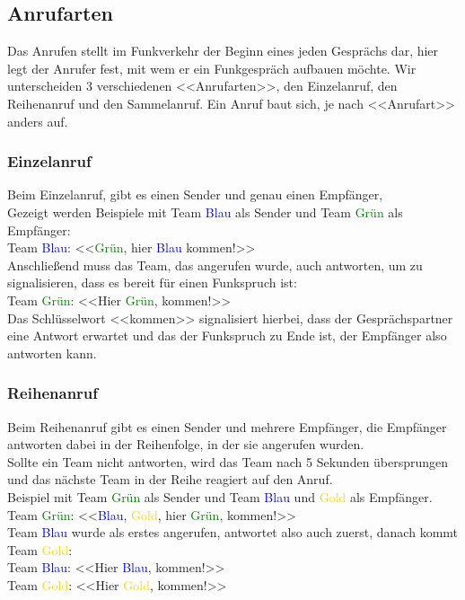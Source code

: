 \subsection{ Anrufarten}
Das Anrufen stellt im Funkverkehr der Beginn eines jeden Gesprächs dar, hier legt der Anrufer fest, mit wem er ein Funkgespräch aufbauen möchte. Wir unterscheiden 3 verschiedenen <<Anrufarten>>, den Einzelanruf, den Reihenanruf und den Sammelanruf. Ein Anruf baut sich, je nach <<Anrufart>> anders auf. \\

\subsubsection{Einzelanruf}
Beim Einzelanruf, gibt es einen Sender und genau einen Empfänger, \\
Gezeigt werden Beispiele mit Team \textcolor{blue}{Blau} als Sender und Team \textcolor{green}{Grün} als Empfänger: \\
Team \textcolor{blue}{Blau}: <<\textcolor{green}{Grün}, hier \textcolor{blue}{Blau} kommen!>> \\
Anschließend muss das Team, das angerufen wurde, auch antworten, um zu signalisieren, dass es bereit für einen Funkspruch ist: \\
Team \textcolor{green}{Grün}: <<Hier \textcolor{green}{Grün}, kommen!>> \\
Das Schlüsselwort <<kommen>> signalisiert hierbei, dass der Gesprächspartner eine Antwort erwartet und das der Funkspruch zu Ende ist, der Empfänger also antworten kann. \\

\subsubsection{Reihenanruf}
Beim Reihenanruf gibt es einen Sender und mehrere Empfänger, die Empfänger antworten dabei in der Reihenfolge, in der sie angerufen wurden. \\
Sollte ein Team nicht antworten, wird das Team nach 5 Sekunden übersprungen und das nächste Team in der Reihe reagiert auf den Anruf. \\
Beispiel mit Team \textcolor{green}{Grün} als Sender und Team \textcolor{blue}{Blau} und \textcolor{gold}{Gold} als Empfänger. \\
Team \textcolor{green}{Grün}: <<\textcolor{blue}{Blau}, \textcolor{gold}{Gold}, hier \textcolor{green}{Grün}, kommen!>> \\
Team \textcolor{blue}{Blau} wurde als erstes angerufen, antwortet also auch zuerst, danach kommt Team \textcolor{gold}{Gold}: \\
Team \textcolor{blue}{Blau}: <<Hier \textcolor{blue}{Blau}, kommen!>> \\
Team \textcolor{gold}{Gold}: <<Hier \textcolor{gold}{Gold}, kommen!>> \\

